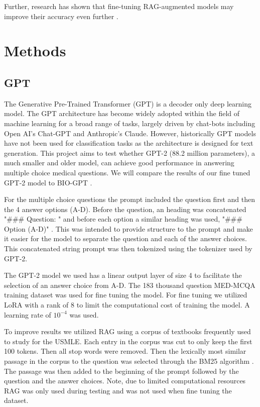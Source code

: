 \documentclass{article}
\begin{document}
Further, research has shown that fine-tuning RAG-augmented models may improve their accuracy even further \cite{hassan2025optimizingmedicalquestionansweringsystems}.

\section{Methods}

\subsection{GPT}
The Generative Pre-Trained Transformer (GPT) is a decoder only deep learning model. The GPT architecture has become widely adopted within the field of machine learning for a broad range of tasks, largely driven by chat-bots including Open AI's Chat-GPT and Anthropic's Claude. However, historically GPT models have not been used for classification tasks as the architecture is designed for text generation. This project aims to test whether GPT-2 (88.2 million parameters), a much smaller and older model, can achieve good performance in answering multiple choice medical questions. We will compare the results of our fine tuned GPT-2 model to BIO-GPT \cite{Luo_2022}.

For the multiple choice questions the prompt included the question first and then the 4 answer options (A-D). Before the question, an heading was concatenated "\#\#\# Question: " and before each option a similar heading was used, "\#\#\# Option (A-D)" \cite{Neural}. This was intended to provide structure to the prompt and make it easier for the model to separate the question and each of the answer choices. This concatenated string prompt was then tokenized using the tokenizer used by GPT-2. 

The GPT-2 model we used has a linear output layer of size 4 to facilitate the selection of an answer choice from A-D. The 183 thousand question MED-MCQA training dataset was used for fine tuning the model. For fine tuning we utilized LoRA \cite{hu2021loralowrankadaptationlarge} with a rank of 8 to limit the computational cost of training the model. A learning rate of $10^{-4}$ was used.

To improve results we utilized RAG \cite{lewis2021retrievalaugmentedgenerationknowledgeintensivenlp} using a corpus of textbooks frequently used to study for the USMLE. Each entry in the corpus was cut to only keep the first 100 tokens. Then all stop words were removed. Then the lexically most similar passage in the corpus to the question was selected through the BM25 algorithm \cite{lewis2021retrievalaugmentedgenerationknowledgeintensivenlp}. The passage was then added to the beginning of the prompt followed by the question and the answer choices. Note, due to limited computational resources RAG was only used during testing and was not used when fine tuning the dataset.
\end{document}
